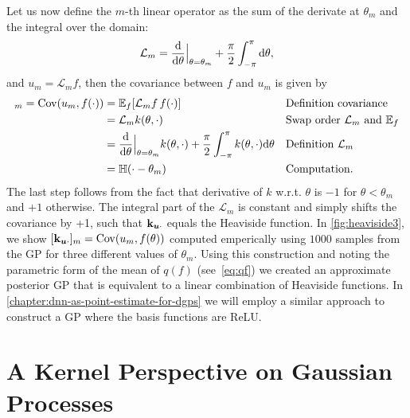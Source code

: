 Let us now define the $m$-th linear operator as the sum of the derivate at $\theta_m$ and the integral over the domain:
\begin{equation}
  \mathcal{L}_m = \frac{\mathrm{d}{}}{\mathrm{d}{\theta}}\Bigr|_{\theta = \theta_m} + \frac{\pi}{2} \int_{-\pi}^{\pi} \mathrm{d}{\theta},
\end{equation}
and $u_m = \mathcal{L}_m f$, then the covariance between $f$ and $u_m$ is given by
\begin{align}
  [\kux]_m = \Cov(u_m, f(\cdot)) &= \Exp{f}{\mathcal{L}_m f\,f(\cdot)} && \text{Definition covariance} \\
                      &=  \mathcal{L}_m k(\theta, \cdot)  && \text{Swap order $\mathcal{L}_m$ and $\mathbb{E}_f$} \\
                      &= \frac{\calcd{}}{\calcd{\theta}}\Bigr|_{\theta = \theta_m} k(\theta, \cdot) + \frac{\pi}{2} \int_{-\pi}^\pi k(\theta, \cdot) \calcd{\theta} && \text{Definition $\mathcal{L}_m$} \\
                      &= \mathbb{H}(\cdot - \theta_m) && \text{Computation}.
\end{align}
The last step follows from the fact that derivative of $k$ w.r.t. $\theta$ is $-1$ for $\theta < \theta_m$ and $+1$ otherwise. The integral part of the $\mathcal{L}_m$ is constant and simply shifts the covariance by +1, such that $\mathbf{k}_{\bm{u} \cdot}$ equals the Heaviside function. In \cref{fig:heaviside3}, we show $[\mathbf{k}_{\bm{u} \cdot}]_m = \mathrm{Cov}(u_m, f(\theta))$ computed emperically using $1000$ samples from the GP for three different values of $\theta_m$. Using this construction and noting the parametric form of the mean of $q(f)$ (see~\cref{eq:qf}) we created an approximate posterior GP that is equivalent to a linear combination of Heaviside functions. In \cref{chapter:dnn-as-point-estimate-for-dgps} we will employ a similar approach to construct a GP where the basis functions are ReLU.

\section{A Kernel Perspective on Gaussian Processes}

